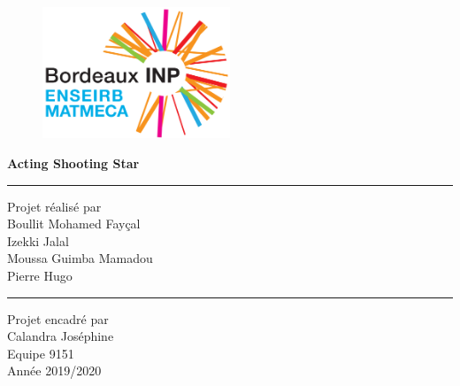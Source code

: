 \documentclass[a4paper,12pt]{article}
\begin{document}
\begin{figure}
    \centering
    \includegraphics[width=0.5\textwidth]{enseirb-matmeca.png}
\end{figure}
\begin{center}
\vspace{0.5\baselineskip}
  \Huge
  { \huge \bfseries Acting Shooting Star}\\[0.4cm]
\vspace{\baselineskip}
\large
\begin{center}
 \rule{0.5\linewidth}{1pt}
 \end{center}

Projet réalisé par \\
\large
\vspace{1\baselineskip}
Boullit Mohamed Fayçal\\
Izekki Jalal\\
Moussa Guimba Mamadou\\
Pierre Hugo\\
\begin{center}
 \rule{0.5\linewidth}{1pt}
 \end{center}
\vspace{2\baselineskip}
\large
Projet encadré par \\
\vspace{1\baselineskip}
Calandra Joséphine\\
\large
\vspace{3\baselineskip}
Equipe 9151\\
\vspace{3\baselineskip}
Année 2019/2020
\end{center}


\newpage

\tableofcontents
\newpage








\end{document}
